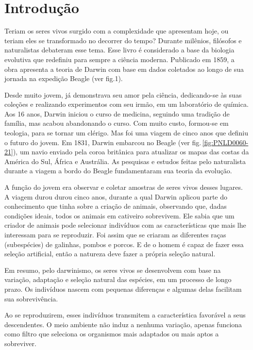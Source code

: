 \documentclass[11pt]{extarticle}
\begin{document}
\tableofcontents

\section{Introdução}

Teriam os seres vivos surgido com a complexidade que apresentam hoje, ou teriam
eles se transformado no decorrer do tempo?
Durante milênios, filósofos e naturalistas debateram esse tema.
Esse livro é considerado a base da biologia evolutiva que redefiniu para sempre
a ciência moderna. Publicado em 1859, a obra apresenta a teoria de Darwin com base em dados coletados ao longo de sua jornada na expedição Beagle (ver fig.1). 


Desde muito jovem, já demonstrava seu amor pela ciência, dedicando-se às suas
coleções e realizando experimentos com seu irmão, em um laboratório de
química. Aos 16 anos, Darwin iniciou o curso de medicina,  seguindo uma tradição de família, mas acabou abandonando o curso.
Com muito custo, formou-se em teologia, para se tornar um clérigo.  Mas foi uma
viagem de cinco anos que definiu o futuro do jovem.  Em 1831, Darwin embarcou
no Beagle (ver fig.\,\ref{fig:PNLD0060-21}), um navio enviado pela coroa britânica para atualizar os mapas das costas da América do Sul,  África e Austrália.
As pesquisas e estudos feitas pelo naturalista durante a viagem a bordo do
Beagle fundamentaram sua teoria da evolução.


A função do jovem era observar e coletar amostras de seres vivos desses
lugares. A viagem durou 
durou cinco anos, durante a qual Darwin aplicou parte do conhecimento que tinha sobre a criação de animais, observando que, dadas condições ideais, todos os animais em cativeiro
sobrevivem. Ele sabia que um criador de animais pode selecionar indivíduos com as características que mais lhe interessam para se reproduzir.
Foi assim que se criaram as diferentes raças (subespécies) de galinhas, pombos
e porcos. E de o homem é capaz de fazer essa seleção artificial, então a natureza deve fazer a própria seleção natural.

Em resumo, pelo darwinismo, os seres vivos se desenvolvem com base na variação,
adaptação e seleção natural das espécies, em um processo de longo prazo.
Os indivíduos nascem com pequenas diferenças e algumas delas facilitam sua
sobrevivência.

Ao se reproduzirem, esses indivíduos transmitem a característica favorável
a seus descendentes. O meio ambiente não induz a nenhuma variação, apenas funciona como filtro que
seleciona os organismos mais adaptados ou mais aptos a sobreviver.
\end{document}
